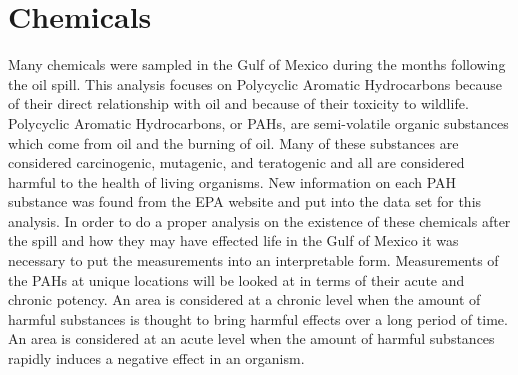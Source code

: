 \documentclass[11pt]{article}
\begin{document}
\section{Chemicals}

Many chemicals were sampled in the Gulf of Mexico during the months following the oil spill.  This analysis focuses on Polycyclic Aromatic Hydrocarbons because of their direct relationship with oil and because of their toxicity to wildlife. Polycyclic Aromatic Hydrocarbons, or PAHs, are semi-volatile organic substances which come from oil and the burning of oil.  Many of these substances are considered carcinogenic, mutagenic, and teratogenic and all are considered harmful to the health of living organisms.  New information on each PAH substance was found from the EPA website and put into the data set for this analysis. In order to do a proper analysis on the existence of these chemicals after the spill and how they may have effected life in the Gulf of Mexico it was necessary to put the measurements into an interpretable form. Measurements of the PAHs at unique locations will be looked at in terms of their acute and chronic potency.  An area is considered at a chronic level when the amount of harmful substances is thought to bring harmful effects over a long period of time.  An area is considered at an acute level when the amount of harmful substances rapidly induces a negative effect in an organism.  
\end{document}
